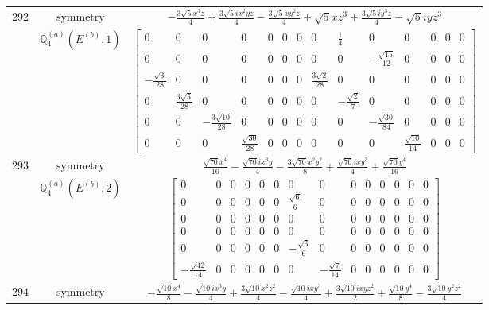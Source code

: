 \documentclass[fleqn,8pt,landscape]{jsarticle}
\begin{document}
\begin{longtable}{ccc}
$ 292 $ & $ \text{symmetry} $ & $ - \frac{3 \sqrt{5} x^{3} z}{4} + \frac{3 \sqrt{5} i x^{2} y z}{4} - \frac{3 \sqrt{5} x y^{2} z}{4} + \sqrt{5} x z^{3} + \frac{3 \sqrt{5} i y^{3} z}{4} - \sqrt{5} i y z^{3} $ \\
$  $ & $ \mathbb{Q}_{4}^{(a)}(E^{(b)},1) $ & $ \begin{bmatrix} 0 & 0 & 0 & 0 & 0 & 0 & 0 & 0 & \frac{1}{4} & 0 & 0 & 0 & 0 & 0 \\ 0 & 0 & 0 & 0 & 0 & 0 & 0 & 0 & 0 & - \frac{\sqrt{15}}{12} & 0 & 0 & 0 & 0 \\ - \frac{\sqrt{3}}{28} & 0 & 0 & 0 & 0 & 0 & 0 & \frac{3 \sqrt{2}}{28} & 0 & 0 & 0 & 0 & 0 & 0 \\ 0 & \frac{3 \sqrt{5}}{28} & 0 & 0 & 0 & 0 & 0 & 0 & - \frac{\sqrt{2}}{7} & 0 & 0 & 0 & 0 & 0 \\ 0 & 0 & - \frac{3 \sqrt{10}}{28} & 0 & 0 & 0 & 0 & 0 & 0 & - \frac{\sqrt{30}}{84} & 0 & 0 & 0 & 0 \\ 0 & 0 & 0 & \frac{\sqrt{30}}{28} & 0 & 0 & 0 & 0 & 0 & 0 & \frac{\sqrt{10}}{14} & 0 & 0 & 0 \end{bmatrix} $ \\ \hline
$ 293 $ & $ \text{symmetry} $ & $ \frac{\sqrt{70} x^{4}}{16} - \frac{\sqrt{70} i x^{3} y}{4} - \frac{3 \sqrt{70} x^{2} y^{2}}{8} + \frac{\sqrt{70} i x y^{3}}{4} + \frac{\sqrt{70} y^{4}}{16} $ \\
$  $ & $ \mathbb{Q}_{4}^{(a)}(E^{(b)},2) $ & $ \begin{bmatrix} 0 & 0 & 0 & 0 & 0 & 0 & 0 & 0 & 0 & 0 & 0 & 0 & 0 & 0 \\ 0 & 0 & 0 & 0 & 0 & 0 & \frac{\sqrt{6}}{6} & 0 & 0 & 0 & 0 & 0 & 0 & 0 \\ 0 & 0 & 0 & 0 & 0 & 0 & 0 & 0 & 0 & 0 & 0 & 0 & 0 & 0 \\ 0 & 0 & 0 & 0 & 0 & 0 & 0 & 0 & 0 & 0 & 0 & 0 & 0 & 0 \\ 0 & 0 & 0 & 0 & 0 & 0 & - \frac{\sqrt{3}}{6} & 0 & 0 & 0 & 0 & 0 & 0 & 0 \\ - \frac{\sqrt{42}}{14} & 0 & 0 & 0 & 0 & 0 & 0 & - \frac{\sqrt{7}}{14} & 0 & 0 & 0 & 0 & 0 & 0 \end{bmatrix} $ \\ \hline
$ 294 $ & $ \text{symmetry} $ & $ - \frac{\sqrt{10} x^{4}}{8} - \frac{\sqrt{10} i x^{3} y}{4} + \frac{3 \sqrt{10} x^{2} z^{2}}{4} - \frac{\sqrt{10} i x y^{3}}{4} + \frac{3 \sqrt{10} i x y z^{2}}{2} + \frac{\sqrt{10} y^{4}}{8} - \frac{3 \sqrt{10} y^{2} z^{2}}{4} $ \\

\end{longtable}
\end{document}
